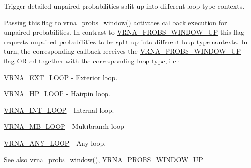 Trigger detailed unpaired probabilities split up into different loop type contexts. 

Passing this flag to \hyperlink{group__part__func__window_ga7115d012988541a65ec323c5f17a334b}{vrna\+\_\+probs\+\_\+window()} activates callback execution for unpaired probabilities. In contrast to \hyperlink{group__part__func__window_ga18325811c7dfc7b7d9d4ac37f4353615}{V\+R\+N\+A\+\_\+\+P\+R\+O\+B\+S\+\_\+\+W\+I\+N\+D\+O\+W\+\_\+\+UP} this flag requests unpaired probabilities to be split up into different loop type contexts. In turn, the corresponding callback receives the \hyperlink{group__part__func__window_ga18325811c7dfc7b7d9d4ac37f4353615}{V\+R\+N\+A\+\_\+\+P\+R\+O\+B\+S\+\_\+\+W\+I\+N\+D\+O\+W\+\_\+\+UP} flag O\+R-\/ed together with the corresponding loop type, i.\+e.\+:


\begin{DoxyItemize}
\item \hyperlink{group__part__func__window_gaf0bb577130090f6c856d1358804250bf}{V\+R\+N\+A\+\_\+\+E\+X\+T\+\_\+\+L\+O\+OP} -\/ Exterior loop.
\item \hyperlink{group__part__func__window_ga30170811c320f3a7b23ffff3b3343b91}{V\+R\+N\+A\+\_\+\+H\+P\+\_\+\+L\+O\+OP} -\/ Hairpin loop.
\item \hyperlink{group__part__func__window_ga956a237e7d956b684b7d593cb3eca665}{V\+R\+N\+A\+\_\+\+I\+N\+T\+\_\+\+L\+O\+OP} -\/ Internal loop.
\item \hyperlink{group__part__func__window_gad905b71f02b3799eb84b490435aec837}{V\+R\+N\+A\+\_\+\+M\+B\+\_\+\+L\+O\+OP} -\/ Multibranch loop.
\item \hyperlink{group__part__func__window_ga1fef1ad234755db78ab6b695edce5080}{V\+R\+N\+A\+\_\+\+A\+N\+Y\+\_\+\+L\+O\+OP} -\/ Any loop.
\end{DoxyItemize}

\begin{DoxySeeAlso}{See also}
\hyperlink{group__part__func__window_ga7115d012988541a65ec323c5f17a334b}{vrna\+\_\+probs\+\_\+window()}, \hyperlink{group__part__func__window_ga18325811c7dfc7b7d9d4ac37f4353615}{V\+R\+N\+A\+\_\+\+P\+R\+O\+B\+S\+\_\+\+W\+I\+N\+D\+O\+W\+\_\+\+UP} 
\end{DoxySeeAlso}
\mbox{\label{group__part__func__window_ga4b79137d9b28b1f9cac7983792ce34a0}} 
